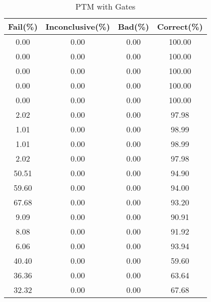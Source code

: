 \documentclass[]{aiaa-tc}%
\begin{document}
\begin{table}[h!]
  \centering

    \begin{tabular}{|c|c|c|c|}
    \toprule
    Fail(\%)  & Inconclusive(\%) & Bad(\%)   & Correct(\%) \\
    \midrule
    0.00  & 0.00  & 0.00  & 100.00 \\
    0.00  & 0.00  & 0.00  & 100.00 \\
    0.00  & 0.00  & 0.00  & 100.00 \\
    0.00  & 0.00  & 0.00  & 100.00 \\
    0.00  & 0.00  & 0.00  & 100.00 \\
    2.02  & 0.00  & 0.00  & 97.98 \\
    1.01  & 0.00  & 0.00  & 98.99 \\
    1.01  & 0.00  & 0.00  & 98.99 \\
    2.02  & 0.00  & 0.00  & 97.98 \\
    50.51 & 0.00  & 0.00  & 94.90 \\
    59.60 & 0.00  & 0.00  & 94.00 \\
    67.68 & 0.00  & 0.00  & 93.20 \\
    9.09  & 0.00  & 0.00  & 90.91 \\
    8.08  & 0.00  & 0.00  & 91.92 \\
    6.06  & 0.00  & 0.00  & 93.94 \\
    40.40 & 0.00  & 0.00  & 59.60 \\
    36.36 & 0.00  & 0.00  & 63.64 \\
    32.32 & 0.00  & 0.00  & 67.68 \\
    \bottomrule
    \end{tabular}%
      \caption{PTM with Gates}
  \label{tab:addlabel}%
\end{table}%
\end{document}
